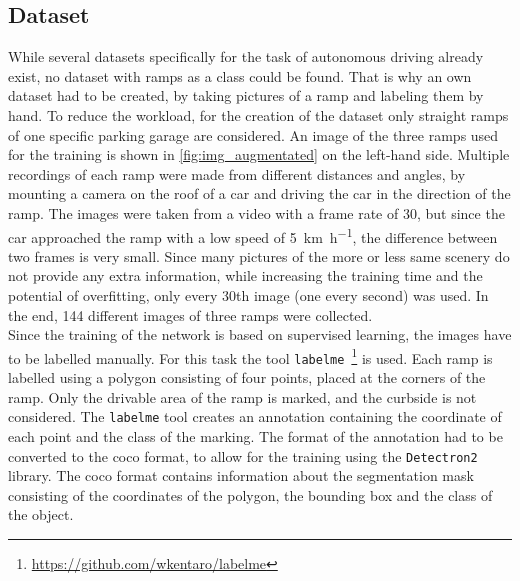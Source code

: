 \subsection{Dataset}
While several datasets specifically for the task of autonomous driving already exist, no dataset with ramps as a class could be found.
That is why an own dataset had to be created, by taking pictures of a ramp and labeling them by hand.
To reduce the workload, for the creation of the dataset only straight ramps of one specific parking garage are considered.
An image of the three ramps used for the training is shown in \cref{fig:img_augmentated} on the left-hand side.
Multiple recordings of each ramp were made from different distances and angles, by mounting a camera on the roof of a car and driving the car in the direction of the ramp.
The images were taken from a video with a frame rate of 30, but since the car approached the ramp with a low speed of \SI{5}{\kilo\metre\per\hour}, the difference between two frames is very small.
Since many pictures of the more or less same scenery do not provide any extra information, while increasing the training time and the potential of overfitting, only every 30th image (one every second) was used.
In the end, 144 different images of three ramps were collected.\\
Since the training of the network is based on supervised learning, the images have to be labelled manually.
For this task the tool \texttt{labelme}~\footnote{\url{https://github.com/wkentaro/labelme}} \cite{Wada2018} is used.
Each ramp is labelled using a polygon consisting of four points, placed at the corners of the ramp.
Only the drivable area of the ramp is marked, and the curbside is not considered.
The \texttt{labelme} tool creates an annotation containing the coordinate of each point and the class of the marking.
The format of the annotation had to be converted to the \gls{coco} format, to allow for the training using the \texttt{Detectron2} library.
The \gls{coco} format contains information about the segmentation mask consisting of the coordinates of the polygon, the bounding box and the class of the object.
